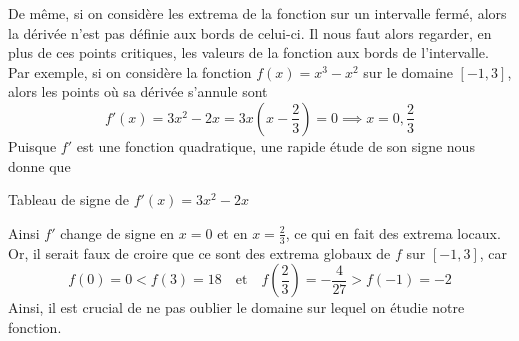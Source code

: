 De même, si on considère les extrema de la fonction sur un intervalle fermé, alors la dérivée n'est pas définie aux bords de celui-ci. Il nous faut alors regarder, en plus de ces points critiques, les valeurs de la fonction aux bords de l'intervalle. Par exemple, si on considère la fonction $f(x) = x^3 - x^2$ sur le domaine $[-1, 3]$, alors les points où sa dérivée s'annule sont
\begin{equation}
f'(x) = 3x^2 - 2x = 3x\left(x-\frac{2}{3} \right) = 0 \implies x = 0, \frac{2}{3}
\end{equation}
Puisque $f'$ est une fonction quadratique, une rapide étude de son signe nous donne que 
\begin{table}[H]
    \centering
    \caption{Tableau de signe de $f'(x) = 3x^2 - 2x$}
    \label{tab:signe_derivee}
\end{table}
Ainsi $f'$ change de signe en $x = 0$ et en $x = \frac{2}{3}$, ce qui en fait des extrema locaux. Or, il serait faux de croire que ce sont des extrema globaux de $f$ sur $[-1, 3]$, car
\begin{equation}
f(0) = 0 < f(3) = 18 \quad \textrm{et} \quad f\left(\frac{2}{3}\right) = -\frac{4}{27} > f(-1) = -2
\end{equation}
Ainsi, il est crucial de ne pas oublier le domaine sur lequel on étudie notre fonction.


